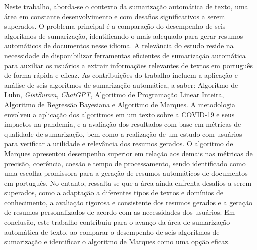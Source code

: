 Neste trabalho, aborda-se o contexto da sumarização automática de texto, uma área em constante desenvolvimento e com desafios significativos a serem superados. O problema principal é a comparação do desempenho de seis algoritmos de sumarização, identificando o mais adequado para gerar resumos automáticos de documentos nesse idioma. A relevância do estudo reside na necessidade de disponibilizar ferramentas eficientes de sumarização automática para auxiliar os usuários a extrair informações relevantes de textos em português de forma rápida e eficaz.
As contribuições do trabalho incluem a aplicação e análise de seis algoritmos de sumarização automática, a saber: Algoritmo de Luhn, \textit{GistSumm}, \textit{ChatGPT}, Algoritmo de Programação Linear Inteira, Algoritmo de Regressão Bayesiana e Algoritmo de Marques. A metodologia envolveu a aplicação dos algoritmos em um texto sobre a COVID-19 e seus impactos na pandemia, e a avaliação dos resultados com base em métricas de qualidade de sumarização, bem como a realização de um estudo com usuários para verificar a utilidade e relevância dos resumos gerados.
O algoritmo de Marques apresentou desempenho superior em relação aos demais nas métricas de precisão, coerência, coesão e tempo de processamento, sendo identificado como uma escolha promissora para a geração de resumos automáticos de documentos em português. No entanto, ressalta-se que a área ainda enfrenta desafios a serem superados, como a adaptação a diferentes tipos de textos e domínios de conhecimento, a avaliação rigorosa e consistente dos resumos gerados e a geração de resumos personalizados de acordo com as necessidades dos usuários.
Em conclusão, este trabalho contribuiu para o avanço da área de sumarização automática de texto, ao comparar o desempenho de seis algoritmos de sumarização e identificar o algoritmo de Marques como uma opção eficaz. 

